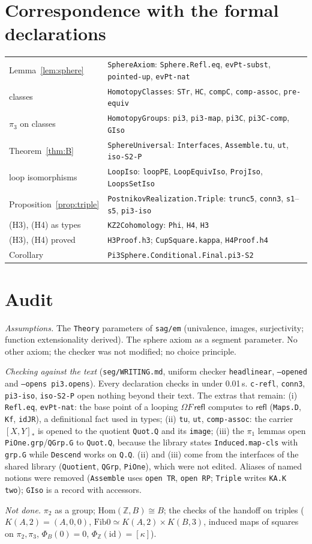 \documentclass[11pt]{amsart}
\theoremstyle{definition}
\theoremstyle{remark}
\newcommand{\Om}{\Omega}
\newcommand{\Hom}{\mathrm{Hom}}
\newcommand{\Fib}{\mathrm{Fib}}
\newcommand{\Z}{\mathbb{Z}}
\newcommand{\cls}[1]{[#1]}
\newcommand{\hc}[2]{[#1,#2]_*}
\newcommand{\code}[1]{\texttt{#1}}
\begin{document}
\section{Correspondence with the formal declarations}\label{sec:corr}

\begin{tabular}{ll}
Lemma~\ref{lem:sphere} & \code{SphereAxiom}: \code{Sphere.Refl.eq}, \code{evPt-subst}, \code{pointed-up}, \code{evPt-nat}\\
classes & \code{HomotopyClasses}: \code{STr}, \code{HC}, \code{compC}, \code{comp-assoc}, \code{pre-equiv}\\
$\pi_3$ on classes & \code{HomotopyGroups}: \code{pi3}, \code{pi3-map}, \code{pi3C}, \code{pi3C-comp}, \code{GIso}\\
Theorem~\ref{thm:B} & \code{SphereUniversal}: \code{Interfaces}, \code{Assemble.tu}, \code{ut}, \code{iso-S2-P}\\
loop isomorphisms & \code{LoopIso}: \code{loopPE}, \code{LoopEquivIso}, \code{ProjIso}, \code{LoopsSetIso}\\
Proposition~\ref{prop:triple} & \code{PostnikovRealization.Triple}: \code{trunc5}, \code{conn3}, \code{s1}--\code{s5}, \code{pi3-iso}\\
(H3), (H4) as types & \code{KZ2Cohomology}: \code{Phi}, \code{H4}, \code{H3}\\
(H3), (H4) proved & \code{H3Proof.h3}; \code{CupSquare.kappa}, \code{H4Proof.h4}\\
Corollary & \code{Pi3Sphere.Conditional.Final.pi3-S2}
\end{tabular}

\section{Audit}\label{sec:audit}

\emph{Assumptions.} The \code{Theory} parameters of \code{sag/em}
(univalence, images, surjectivity; function extensionality derived).
The sphere axiom as a segment parameter. No other axiom; the checker was
not modified; no choice principle.

\emph{Checking against the text} (\code{seg/WRITING.md}, uniform checker
\code{headlinear}, \code{--opened} and \code{--opens pi3.opens}). Every
declaration checks in under 0.01\,s. \code{c-refl}, \code{conn3},
\code{pi3-iso}, \code{iso-S2-P} open nothing beyond their text. The
extras that remain: (i) \code{Refl.eq}, \code{evPt-nat}: the base point of
a looping $\Om F\,\mathsf{refl}$ computes to $\mathsf{refl}$
(\code{Maps.D}, \code{Kf}, \code{idJR}), a definitional fact used in types;
(ii) \code{tu}, \code{ut}, \code{comp-assoc}: the carrier $\hc XY$ is opened
to the quotient \code{Quot.Q} and its \code{image}; (iii) the $\pi_1$
lemmas open \code{PiOne.grp}/\code{QGrp.G} to \code{Quot.Q}, because
the library states \code{Induced.map-cls} with \code{grp.G} while
\code{Descend} works on \code{Q.Q}. (ii) and (iii) come from the
interfaces of the shared library (\code{Quotient}, \code{QGrp},
\code{PiOne}), which were not edited. Aliases of named notions were
removed (\code{Assemble} uses \code{open TR}, \code{open RP}; \code{Triple}
writes \code{KA.K two}); \code{GIso} is a record with accessors.

\emph{Not done.} $\pi_2$ as a group;
$\Hom(\Z,B)\cong B$; the checks of the handoff on triples
($K(A,2)=(A,0,0)$, $\Fib0\simeq K(A,2)\times K(B,3)$, induced maps of
squares on $\pi_2,\pi_3$, $\Phi_B(0)=0$, $\Phi_\Z(\mathrm{id})=\cls\kappa$).
\end{document}
